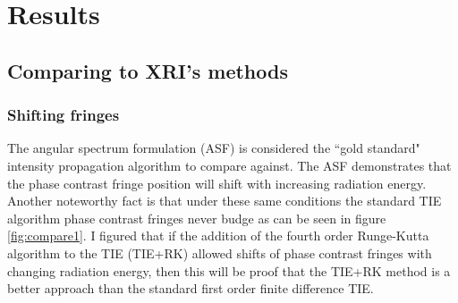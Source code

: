 \documentclass[10pt, a4paper, singlespacing]{report}
\begin{document}

\section{Results}\label{Results}

\subsection{Comparing to XRI's methods}\label{RK}

\subsubsection{Shifting fringes}
The angular spectrum formulation (ASF) is considered the ``gold standard" intensity propagation algorithm to compare against. The ASF demonstrates that the phase contrast fringe position will shift with increasing radiation energy. Another noteworthy fact is that under these same conditions the standard TIE algorithm phase contrast fringes never budge as can be seen in figure \ref{fig:compare1}. I figured that if the addition of the fourth order Runge-Kutta algorithm to the TIE (TIE+RK) allowed shifts of phase contrast fringes with changing radiation energy, then this will be proof that the TIE+RK method is a better approach than the standard first order finite difference TIE.
\end{document}
